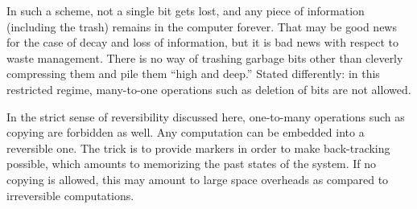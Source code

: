 In such a scheme, not a single bit
gets lost, and any piece of information (including the trash) remains in
the
computer forever. That may be good news for the case of decay and loss
of information, but it is bad news with respect to waste management.
There is no way of trashing garbage bits other than cleverly
compressing them and pile them ``high and deep.''
Stated differently:
in this restricted regime,
many-to-one operations such as deletion of bits are
not allowed.

In the strict sense of reversibility discussed here,
one-to-many operations such as copying are forbidden as well.
Any computation can be embedded into a reversible one. The trick is
to provide markers in order to make back-tracking possible, which amounts
to
memorizing the past states of the system. If no copying is allowed, this
may amount to large space overheads as compared to irreversible
computations.



